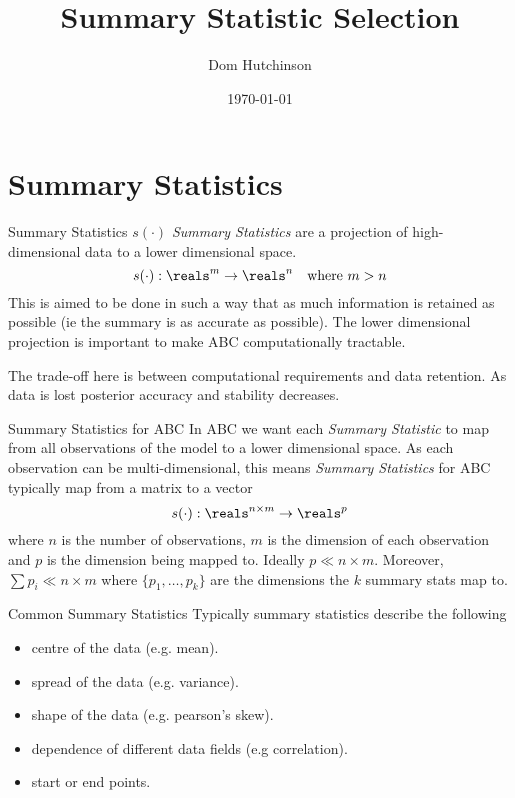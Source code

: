 \documentclass[11pt,a4paper]{article}
\begin{document}
\title{Summary Statistic Selection}
\author{Dom Hutchinson}
\date{\today}
\maketitle

\tableofcontents

\section{Summary Statistics}

  \begin{definition}{Summary Statistics $s(\cdot)$}
    \textit{Summary Statistics} are a projection of high-dimensional data to a lower dimensional space.
    \[ s(\cdot):\reals^m\to\reals^n\quad\text{where }m>n \]
    This is aimed to be done in such a way that as much information is retained as possible (ie the summary is as accurate as possible). The lower dimensional projection is important to make ABC computationally tractable.
    \par The trade-off here is between computational requirements and data retention. As data is lost posterior accuracy and stability decreases.
  \end{definition}

  \begin{remark}{Summary Statistics for ABC}
    In ABC we want each \textit{Summary Statistic} to map from all observations of the model to a lower dimensional space. As each observation can be multi-dimensional, this means \textit{Summary Statistics} for ABC typically map from a matrix to a vector
    \[ s(\cdot):\reals^{n\times m}\to\reals^p \]
    where $n$ is the number of observations, $m$ is the dimension of each observation and $p$ is the dimension being mapped to. Ideally $p\ll n\times m$. Moreover, $\sum p_i\ll n\times m$ where $\{p_1,\dots,p_k\}$ are the dimensions the $k$ summary stats map to.
  \end{remark}

  \begin{proposition}{Common Summary Statistics}
    Typically summary statistics describe the following
    \begin{itemize}
      \item centre of the data (e.g. mean).
      \item spread of the data (e.g. variance).
      \item shape of the data (e.g. pearson's skew).
      \item dependence of different data fields (e.g correlation).
      \item start or end points.
    \end{itemize}
  \end{proposition}
\end{document}
